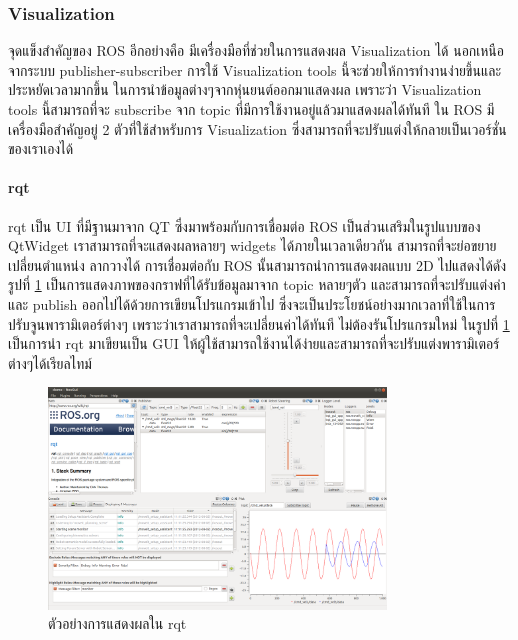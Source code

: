 \subsubsection*{Visualization}
จุดแข็งสำคัญของ ROS อีกอย่างคือ มีเครื่องมือที่ช่วยในการแสดงผล Visualization ได้ นอกเหนือจากระบบ
publisher-subscriber การใช้ Visualization tools นี้จะช่วยให้การทำงานง่ายขึ้นและประหยัดเวลามากขึ้น
ในการนำข้อมูลต่างๆจากหุ่นยนต์ออกมาแสดงผล เพราะว่า Visualization tools นี้สามารถที่จะ subscribe
จาก topic ที่มีการใช้งานอยู่แล้วมาแสดงผลได้ทันที ใน ROS มีเครื่องมือสำคัญอยู่ 2 ตัวที่ใช้สำหรับการ Visualization
ซึ่งสามารถที่จะปรับแต่งให้กลายเป็นเวอร์ชั่นของเราเองได้

\paragraph*{rqt}
rqt เป็น UI ที่มีฐานมาจาก QT ซึ่งมาพร้อมกับการเชื่อมต่อ ROS เป็นส่วนเสริมในรูปแบบของ QtWidget
เราสามารถที่จะแสดงผลหลายๆ widgets ได้ภายในเวลาเดียวกัน สามารถที่จะย่อขยาย เปลี่ยนตำแหน่ง
ลากวางได้ การเชื่อมต่อกับ ROS นั้นสามารถนำการแสดงผลแบบ 2D ไปแสดงได้ดังรูปที่ \ref{fig:ros_gui_example}
เป็นการแสดงภาพของกราฟที่ได้รับข้อมูลมาจาก topic หลายๆตัว และสามารถที่จะปรับแต่งค่าและ publish
ออกไปได้ด้วยการเขียนโปรแกรมเข้าไป ซึ่งจะเป็นประโยชน์อย่างมากเวลาที่ใช้ในการปรับจูนพารามิเตอร์ต่างๆ
เพราะว่าเราสามารถที่จะเปลี่ยนค่าได้ทันที ไม่ต้องรันโปรแกรมใหม่ ในรูปที่ \ref{fig:ros_gui_example}
เป็นการนำ rqt มาเขียนเป็น GUI ให้ผู้ใช้สามารถใช้งานได้ง่ายและสามารถที่จะปรับแต่งพารามิเตอร์ต่างๆได้เรียลไทม์

\begin{figure}[!ht]
    \centering
    \includegraphics[width=0.8\textwidth]{chapter2/images/ros_gui_example.png}
	\caption{ตัวอย่างการแสดงผลใน rqt }
    \label{fig:ros_gui_example}
\end{figure}

